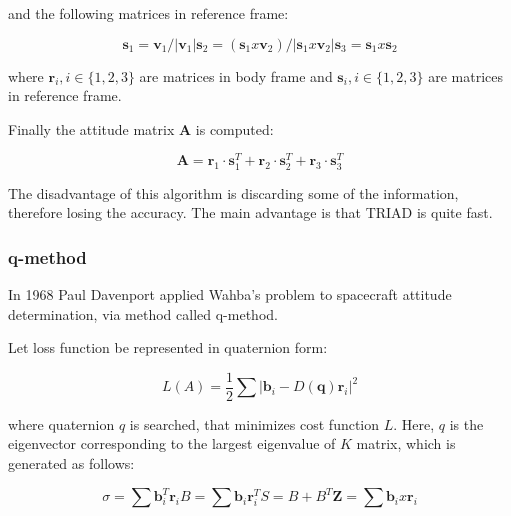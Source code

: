 \documentclass[12pt,a4paper,twoside]{article}
\begin{document}
and the following matrices in reference frame:

\begin{subequations}
\begin{equation}
\bm{s}_1 = \bm{v}_1/|\bm{v}_1|
\end{equation}
\begin{equation}
\bm{s}_2 = (\bm{s}_1 x \bm{v}_2) /|\bm{s}_1 x \bm{v}_2|
\end{equation}
\begin{equation}
\bm{s}_3 = \bm{s}_1 x \bm{s}_2
\end{equation}
\end{subequations}

where $\bm{r}_i, i\in\{1, 2, 3\}$ are matrices in body frame and $\bm{s}_i, i\in\{1, 2, 3\}$ are matrices in reference frame.


Finally the attitude matrix $\bm{A}$ is computed:

\begin{equation}
\bm{A} = \bm{r}_1 \cdot \bm{s}_1^T + \bm{r}_2 \cdot \bm{s}_2^T + \bm{r}_3 \cdot \bm{s}_3^T 
\end{equation}


The disadvantage of this algorithm is discarding some of the information, therefore losing the accuracy. The main advantage is that TRIAD is quite fast.


\subsubsection{q-method}

In 1968 Paul Davenport applied Wahba’s problem to spacecraft attitude determination, via method called q-method\cite{keat1977analysis}. 

Let loss function be represented in quaternion form:

\begin{equation}
L(A) = \frac{1}{2} \sum |\bm{b}_i - D(\bm{q})\bm{r}_i|^2
\end{equation}

where quaternion $q$ is searched, that minimizes cost function $L$. Here, $q$ is the eigenvector corresponding to the largest eigenvalue of $K$ matrix, which is generated as follows:

\begin{subequations}
\begin{equation}
\sigma = \sum \bm{b}_i^T\bm{r}_i
\end{equation}
\begin{equation}
B = \sum \bm{b}_i\bm{r}_i^T
\end{equation}
\begin{equation}
S = B + B^T
\end{equation}
\begin{equation}
\bm{Z} = \sum \bm{b}_i x \bm{r}_i
\end{equation}
\end{subequations}
\end{document}
